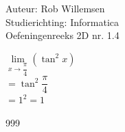\documentclass[a4paper]{article}
\begin{document}
\noindent \large Auteur: Rob Willemsen \\
\noindent \large Studierichting: Informatica\\
\noindent \large Oefeningenreeks 2D nr. 1.4\\

\medskip

\normalsize

$\lim\limits_{x \rightarrow \dfrac{\pi}{4}} (\tan^2 x)$ \\ 

$= \tan^2 \dfrac{\pi}{4}$ \\

$= 1^2 = 1$ \\

\begin{thebibliography}{999}
\end{thebibliography}
\end{document}
